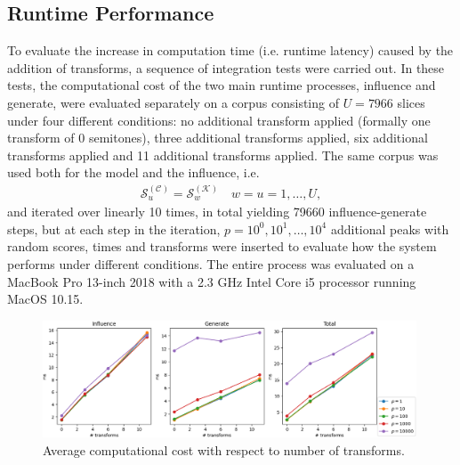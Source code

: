 \subsection{Runtime Performance}\label{ssec:transforms-performance}
To evaluate the increase in computation time (i.e. runtime latency) caused by the addition of transforms, a sequence of integration tests were carried out. In these tests, the computational cost of the two main runtime processes, influence and generate, were evaluated separately on a corpus consisting of $U=7966$ slices under four different conditions: no additional transform applied (formally one transform of 0 semitones), three additional transforms applied, six additional transforms applied and 11 additional transforms applied. The same corpus was used both for the model and the influence, i.e. 
	\begin{align}
		\mathcal S^{(\mathcal C)}_u = \mathcal S^{(\mathcal K)}_w \quad w = u = 	1,\dots,U,
	\end{align}
	and iterated over linearly 10 times, in total yielding 79660 influence-generate steps, but at each step in the iteration, $p = 10^0, 10^1, \dots, 10^4$ additional peaks with random scores, times and transforms were inserted to evaluate how the system performs under different conditions. The entire process was evaluated on a MacBook Pro 13-inch 2018 with a 2.3 GHz Intel Core i5 processor running MacOS 10.15.

	\begin{figure}[h!]
    \centering        
 	\includegraphics[width=0.99\textwidth]{Figures/evaluation_performance.png}
    \caption{Average computational cost with respect to number of transforms.}
    \label{fig:transform-evaluation}
	\end{figure}
	
